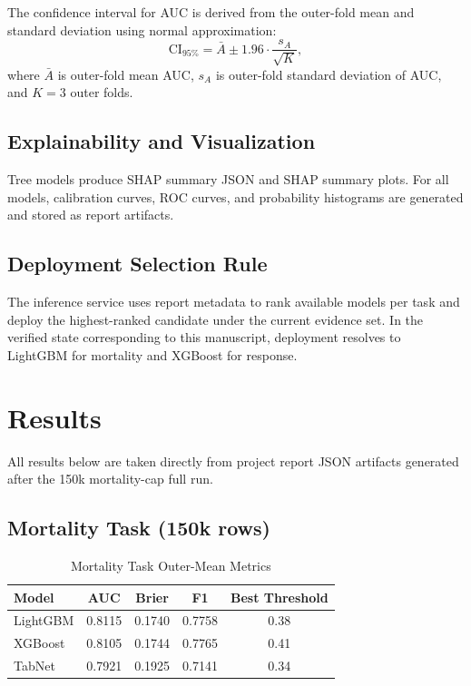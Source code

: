 \documentclass[journal]{IEEEtran}
\begin{document}
The confidence interval for AUC is derived from the outer-fold mean and standard deviation using normal approximation:
\begin{equation}
\mathrm{CI}_{95\%} = \bar{A} \pm 1.96 \cdot \frac{s_A}{\sqrt{K}},
\end{equation}
where $\bar{A}$ is outer-fold mean AUC, $s_A$ is outer-fold standard deviation of AUC, and $K=3$ outer folds.

\subsection{Explainability and Visualization}
Tree models produce SHAP summary JSON and SHAP summary plots. For all models, calibration curves, ROC curves, and probability histograms are generated and stored as report artifacts.

\subsection{Deployment Selection Rule}
The inference service uses report metadata to rank available models per task and deploy the highest-ranked candidate under the current evidence set. In the verified state corresponding to this manuscript, deployment resolves to LightGBM for mortality and XGBoost for response.

\section{Results}
All results below are taken directly from project report JSON artifacts generated after the 150k mortality-cap full run.

\subsection{Mortality Task (150k rows)}
\begin{table}[htbp]
\caption{Mortality Task Outer-Mean Metrics}
\label{tab:mortality}
\centering
\small
\begin{tabular}{lcccc}
\toprule
Model & AUC & Brier & F1 & Best Threshold \\
\midrule
LightGBM & 0.8115 & 0.1740 & 0.7758 & 0.38 \\
XGBoost & 0.8105 & 0.1744 & 0.7765 & 0.41 \\
TabNet & 0.7921 & 0.1925 & 0.7141 & 0.34 \\
\bottomrule
\end{tabular}
\end{table}
\end{document}
